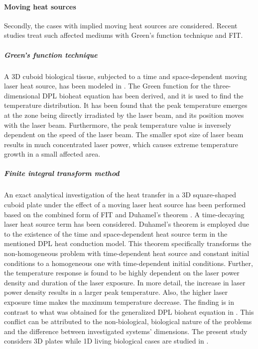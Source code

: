 \documentclass[sn-mathphys]{sn-jnl}%
\theoremstyle{thmstyleone}%
\theoremstyle{thmstyletwo}%
\theoremstyle{thmstylethree}%
\begin{document}
\paragraph{Moving heat sources}
Secondly, the cases with implied moving heat sources are considered. Recent studies treat such affected mediums with Green's function technique and FIT.
\subparagraph{Green's function technique}
A 3D cuboid biological tissue, subjected to a time and space-dependent moving laser heat source, has been modeled in \cite{Ma20182}. The Green function for the three-dimensional DPL bioheat equation has been derived, and it is used to find the temperature distribution. It has been found that the peak temperature emerges at the zone being directly irradiated by the laser beam, and its position moves with the laser beam. Furthermore, the peak temperature value is inversely dependent on the speed of the laser beam. The smaller spot size of laser beam results in much concentrated laser power, which causes extreme temperature growth in a small affected area.

\subparagraph{Finite integral transform method}
An exact analytical investigation of the heat transfer in a 3D square-shaped cuboid plate under the effect of a moving laser heat source has been performed based on the combined form of FIT and Duhamel's theorem \cite{JDutta2020}. A time-decaying laser heat source term has been considered. Duhamel's theorem is employed due to the existence of the time and space-dependent heat source term in the mentioned DPL heat conduction model. This theorem specifically transforms the non-homogeneous problem with time-dependent heat source and constant initial conditions to a homogeneous one with time-dependent initial conditions. Further, the temperature response is found to be highly dependent on the laser power density and duration of the laser exposure. In more detail, the increase in laser power density results in a larger peak temperature. Also, the higher laser exposure time makes the maximum temperature decrease. The finding is in contrast to what was obtained for the generalized DPL bioheat equation in \cite{Afrin2017}. This conflict can be attributed to the non-biological, biological nature of the problems and the difference between investigated systems' dimensions. The present study considers 3D plates while 1D living biological cases are studied in \cite{Afrin2017}.

\end{document}
